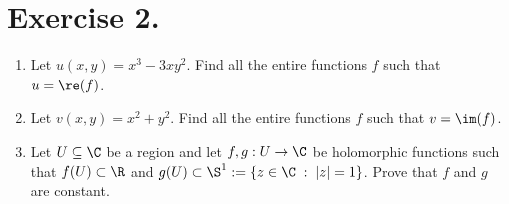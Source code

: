 \section*{Exercise 2.}

\begin{enumerate}[label=(\alph*)]
    \item Let $u(x,y) = x^3-3xy^2$. Find all the entire functions $f$ such that $u = \re(f)$.
    \item Let $v(x,y) = x^2 + y^2$. Find all the entire functions $f$ such that $v = \im(f)$.
    \item Let $U\subseteq \C$ be a region and let $f,g : U \to \C$ be holomorphic functions such that $f(U) \subset \R$ and $g(U) \subset \S^1 := \{z \in\C \;:\; |z| = 1\}$. Prove that $f$ and $g$ are constant. 
\end{enumerate}